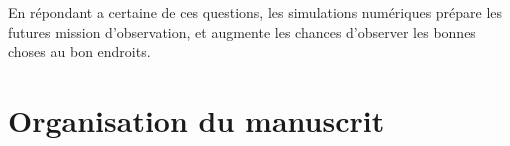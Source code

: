 En répondant a certaine de ces questions, les simulations numériques prépare les futures mission d'observation, et augmente les chances d'observer les bonnes choses au bon endroits.





%
%






\section{Organisation du manuscrit}

